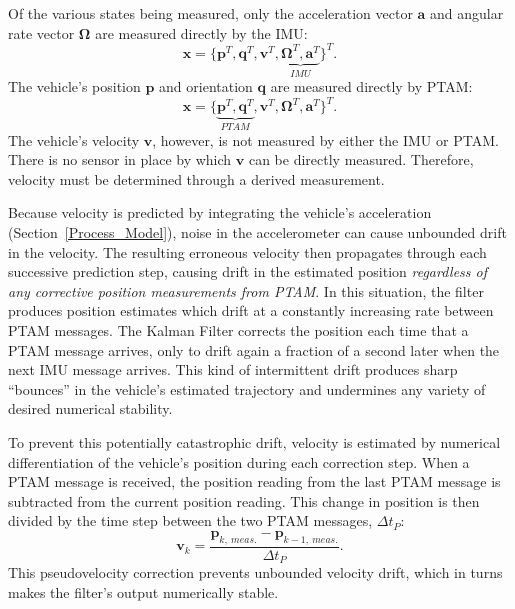Of the various states being measured, only the acceleration vector $\mathbf{a}$ and angular rate vector $\bm{\Omega}$ are measured directly by the IMU:
%
\begin{equation}
\mathbf{x} = 
\Big\{   
    \mathbf{p}^{T},
    \mathbf{q}^{T},
    \mathbf{v}^{T},
    \underbrace{
    \bm{\Omega}^{T},
    \mathbf{a}^{T}}_{IMU}
\Big\} ^{T}.
\end{equation}
%
The vehicle's position $\mathbf{p}$ and orientation $\mathbf{q}$ are measured directly by PTAM:
%
\begin{equation}
\mathbf{x} = 
\Big\{
\underbrace{
    \mathbf{p}^{T},
    \mathbf{q}^{T}}_{PTAM},
    \mathbf{v}^{T},
    \bm{\Omega}^{T},
    \mathbf{a}^{T}
\Big\} ^{T}.
\end{equation}
%
The vehicle's velocity $\mathbf{v}$, however, is not measured by either the IMU or PTAM. There is no sensor in place by which $\mathbf{v}$ can be directly measured. Therefore, velocity must be determined through a derived measurement.

Because velocity is predicted by integrating the vehicle's acceleration (Section~\ref{Process_Model}), noise in the accelerometer can cause unbounded drift in the velocity. The resulting erroneous velocity then propagates through each successive prediction step, causing drift in the estimated position \textit{regardless of any corrective position measurements from PTAM}. In this situation, the filter produces position estimates which drift at a constantly increasing rate between PTAM messages. The Kalman Filter corrects the position each time that a PTAM message arrives, only to drift again a fraction of a second later when the next IMU message arrives. This kind of intermittent drift produces sharp ``bounces'' in the vehicle's estimated trajectory and undermines any variety of desired numerical stability.

To prevent this potentially catastrophic drift, velocity is estimated by numerical differentiation of the vehicle's position during each correction step. When a PTAM message is received, the position reading from the last PTAM message is subtracted from the current position reading. This change in position is then divided by the time step between the two PTAM messages, $\Delta t_{P}$:
%
\begin{equation}
\mathbf{v}_{k} = \frac{\mathbf{p}_{k,\ meas.} - \mathbf{p}_{k-1,\ meas.}}{\Delta t_{P}} .
\end{equation}
%
This pseudovelocity correction prevents unbounded velocity drift, which in turns makes the filter's output numerically stable.

